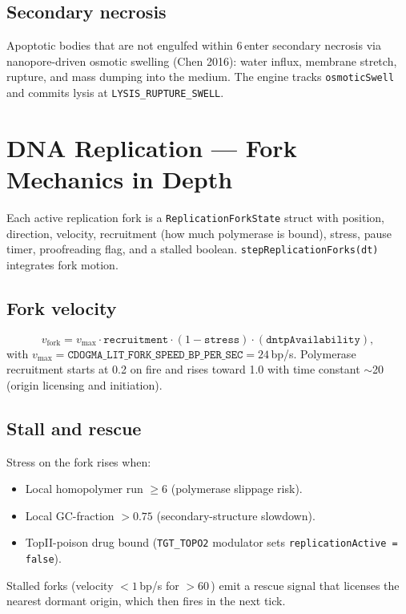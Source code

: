 \documentclass[11pt,letterpaper,twoside,openany]{book}
\newcommand{\code}[1]{\texttt{#1}}
\newcommand{\bioh}{\text{bio-h}}
\newcommand{\biosec}{\text{bio-s}}
\begin{document}
\section{Secondary necrosis}

Apoptotic bodies that are not engulfed within 6\,\bioh enter
secondary necrosis via nanopore-driven osmotic swelling (Chen 2016):
water influx, membrane stretch, rupture, and mass dumping into the
medium. The engine tracks \code{osmoticSwell} and commits lysis at
\code{LYSIS\_RUPTURE\_SWELL}.

\chapter{DNA Replication --- Fork Mechanics in Depth}
\label{ch:replication-deep}

Each active replication fork is a \code{ReplicationForkState} struct
with position, direction, velocity, recruitment (how much polymerase
is bound), stress, pause timer, proofreading flag, and a stalled
boolean. \code{stepReplicationForks(dt)} integrates fork motion.

\section{Fork velocity}

\begin{equation}
  v_{\text{fork}} = v_{\text{max}} \cdot \code{recruitment}\cdot (1 - \code{stress})\cdot (\code{dntpAvailability}),
\end{equation}
with $v_{\text{max}} = \code{CDOGMA\_LIT\_FORK\_SPEED\_BP\_PER\_SEC} = 24$\,bp/s.
Polymerase recruitment starts at 0.2 on fire and rises toward 1.0
with time constant $\sim$20\,\biosec (origin licensing and
initiation).

\section{Stall and rescue}

Stress on the fork rises when:
\begin{itemize}
  \item Local homopolymer run $\ge 6$ (polymerase slippage risk).
  \item Local GC-fraction $> 0.75$ (secondary-structure slowdown).
  \item TopII-poison drug bound (\code{TGT\_TOPO2} modulator sets
        \code{replicationActive = false}).
\end{itemize}
Stalled forks (velocity $< 1$\,bp/s for $> 60$\,\biosec) emit a
rescue signal that licenses the nearest dormant origin, which then
fires in the next tick.
\end{document}
